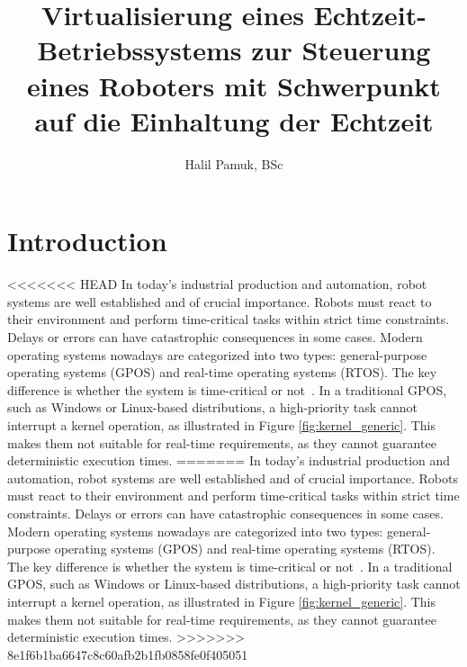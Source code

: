 \documentclass[MMR,Master,english]{twbook}
\title{Virtualisierung eines Echtzeit-Betriebssystems zur Steuerung eines Roboters mit Schwerpunkt auf die
Einhaltung der Echtzeit}
\author{Halil Pamuk, BSc}
\begin{document}
\maketitle
%
%
%



\chapter{Introduction}\label{cha:introduction}
<<<<<<< HEAD
In today's industrial production and automation, robot systems are well established and of crucial importance. Robots must react to their environment and perform time-critical tasks within strict time constraints. Delays or errors can have catastrophic consequences in some cases. Modern operating systems nowadays are categorized into two types:  general-purpose operating systems (GPOS) and real-time operating systems (RTOS). The key difference is whether the system is time-critical or not~\cite{canbazPerformanceAnalysisRealtime2022}. In a traditional GPOS, such as Windows or Linux-based distributions, a high-priority task cannot interrupt a kernel operation, as illustrated in Figure \ref{fig:kernel_generic}. This makes them not suitable for real-time requirements, as they cannot guarantee deterministic execution times. 
=======
In today's industrial production and automation, robot systems are well established and of crucial importance. Robots must react to their environment and perform time-critical tasks within strict time constraints. Delays or errors can have catastrophic consequences in some cases. Modern operating systems nowadays are categorized into two types:  general-purpose operating systems (GPOS) and real-time operating systems (RTOS). The key difference is whether the system is time-critical or not~\cite{canbazPerformanceAnalysisRealtime2022}. In a traditional GPOS, such as Windows or Linux-based distributions, a high-priority task cannot interrupt a kernel operation, as illustrated in Figure \ref{fig:kernel_generic}. This makes them not suitable for real-time requirements, as they cannot guarantee deterministic execution times.
>>>>>>> 8e1f6b1ba6647c8c60afb2b1fb0858fe0f405051
\end{document}
